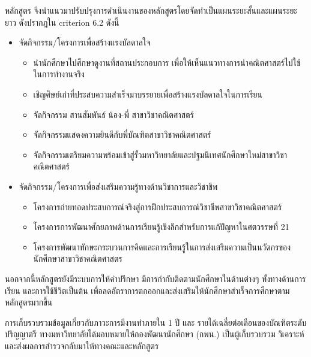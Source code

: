 หลักสูตร จึงนำแนวมาปรับปรุงการดำเนินงานของหลักสูตรโดยจัดทำเป็นแผนระยะสั้นและแผนระยะยาว ดังปรากฎใน criterion 6.2 ดังนี้
 \begin{itemize}
\item จัดกิจกรรม/โครงการเพื่อสร้างแรงบัลดาลใจ
 \begin{itemize}
 	\item นำนักศึกษาไปศึกษาดูงานที่สถานประกอบการ  เพื่อให้เห็นแนวทางการนำคณิตศาสตร์ไปใช้ในการทำงานจริง
  	\item เชิญศิษย์เก่าที่ประสบความสำเร็จมาบรรยายเพื่อสร้างแรงบัลดาลใจในการเรียน
 	\item จัดกิจกรรม สานสัมพันธ์ น้อง-พี่ สาขาวิชาคณิตศาสตร์
 	\item จัดกิจกรรมแสดงความยินดีกับพี่บัณฑิตสาขาวิชาคณิตศาสตร์
 	\item จัดกิจกรรมเตรียมความพร้อมเข้าสู่รั้วมหาวิทยาลัยและปฐมนิเทศนักศึกษาใหม่สาขาวิชาคณิตศาสตร์
 	 \end{itemize}
 \item จัดกิจกรรม/โครงการเพื่อส่งเสริมความรู้ทางด้านวิชาการและวิชาชีพ
 \begin{itemize}
 	\item โครงการถ่ายทอดประสบการณ์จริงสู่การฝึกประสบการณ์วิชาชีพสาขาวิชาคณิตศาสตร์
 	\item โครงการการพัฒนาศักยภาพด้านการเรียนรู้เชิงลึกสำหรับการแก้ปัญหาในศตวรรษที่ 21
 	\item โครงการพัฒนาทักษะกระบวนการคิดและการเรียนรู้ในการส่งเสริมความเป็นนวัตกรของนักศึกษาสาขาวิชาคณิตศาสตร
 \end{itemize}
 \end{itemize}

นอกจากนี้หลักสูตรยังมีระบบการให้คำปรึกษา มีการกำกับติดตามนักศึกษาในด้านต่างๆ ทั้งทางด้านการเรียน และการใช้ชีวิตเป็นต้น เพื่อลดอัตราการตกออกและส่งเสริมให้นักศึกษาสำเร็จการศึกษาตามหลักสูตรมากขึ้น
\begin{doclist}
\end{doclist}



การเก็บรวบรวมข้อมูลเกี่ยวกับภาวะการมีงานทำภายใน 1 ปี และ รายได้เฉลี่ยต่อเดือนของบัณฑิตระดับปริญญาตรี  ทางมหาวิทยาลัยได้มอบหมายให้กองพัฒนานักศึกษา (กพน.) เป็นผู้เก็บรวบรวม วิเคราะห์ และส่งผลการสำรวจกลับมาให้ทางคณะและหลักสูตร 


